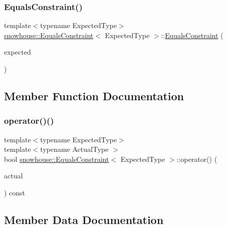 \subsubsection{\texorpdfstring{EqualsConstraint()}{EqualsConstraint()}}
{\footnotesize\ttfamily template$<$typename Expected\+Type$>$ \\
\mbox{\hyperlink{structsnowhouse_1_1EqualsConstraint}{snowhouse\+::\+Equals\+Constraint}}$<$ Expected\+Type $>$\+::\mbox{\hyperlink{structsnowhouse_1_1EqualsConstraint}{Equals\+Constraint}} (\begin{DoxyParamCaption}\item[{const Expected\+Type \&}]{expected }\end{DoxyParamCaption})\hspace{0.3cm}{\ttfamily [inline]}}



\subsection{Member Function Documentation}
\mbox{\label{structsnowhouse_1_1EqualsConstraint_ad2607165474aeedd79d210ceeac07dcb}} 
\subsubsection{\texorpdfstring{operator()()}{operator()()}}
{\footnotesize\ttfamily template$<$typename Expected\+Type$>$ \\
template$<$typename Actual\+Type $>$ \\
bool \mbox{\hyperlink{structsnowhouse_1_1EqualsConstraint}{snowhouse\+::\+Equals\+Constraint}}$<$ Expected\+Type $>$\+::operator() (\begin{DoxyParamCaption}\item[{const Actual\+Type \&}]{actual }\end{DoxyParamCaption}) const\hspace{0.3cm}{\ttfamily [inline]}}



\subsection{Member Data Documentation}
\mbox{\label{structsnowhouse_1_1EqualsConstraint_af7abf04eeaf13fce36215a5a31726375}} 
